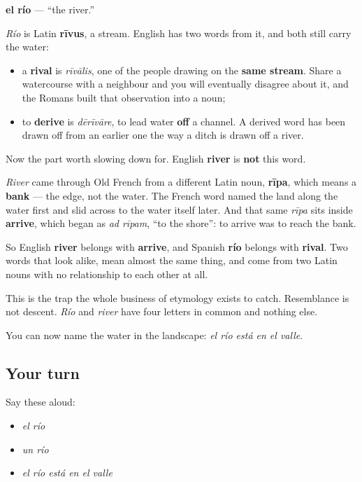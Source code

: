 \begin{cousinweb}
\textbf{el río} — \textquotedblleft{}the river.\textquotedblright{}

\emph{Río} is Latin \textbf{rīvus}, a stream. English has two words from it, and both still carry the water:

\begin{itemize}
\raggedright
  \item a \textbf{rival} is \emph{rīvālis}, one of the people drawing on the \textbf{same stream}. Share a watercourse with a neighbour and you will eventually disagree about it, and the Romans built that observation into a noun;
  \item to \textbf{derive} is \emph{dērīvāre}, to lead water \textbf{off} a channel. A derived word has been drawn off from an earlier one the way a ditch is drawn off a river.
\end{itemize}

Now the part worth slowing down for. English \textbf{river} is \textbf{not} this word.

\emph{River} came through Old French from a different Latin noun, \textbf{rīpa}, which means a \textbf{bank} — the edge, not the water. The French word named the land along the water first and slid across to the water itself later. And that same \emph{rīpa} sits inside \textbf{arrive}, which began as \emph{ad rīpam}, \textquotedblleft{}to the shore\textquotedblright{}: to arrive was to reach the bank.

So English \textbf{river} belongs with \textbf{arrive}, and Spanish \textbf{río} belongs with \textbf{rival}. Two words that look alike, mean almost the same thing, and come from two Latin nouns with no relationship to each other at all.

This is the trap the whole business of etymology exists to catch. Resemblance is not descent. \emph{Río} and \emph{river} have four letters in common and nothing else.
\end{cousinweb}

\begin{grammarlens}[title={What you've built}]
You can now name the water in the landscape: \emph{el río está en el valle}.
\end{grammarlens}

\subsection*{Your turn}
Say these aloud:

\begin{itemize}
\raggedright
  \item \emph{el río}
  \item \emph{un río}
  \item \emph{el río está en el valle}
\end{itemize}

